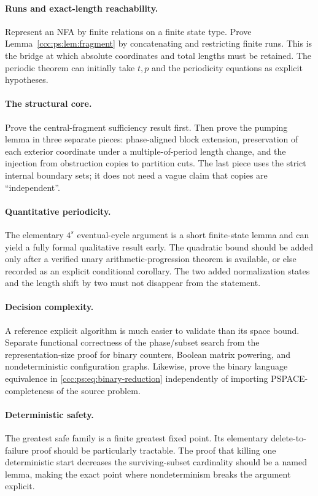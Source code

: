 \documentclass[11pt,letterpaper]{article}
\theoremstyle{definition}
\theoremstyle{remark}
\begin{document}
\paragraph{Runs and exact-length reachability.}
Represent an NFA by finite relations on a finite state type. Prove
Lemma~\ref{ccc:ps:lem:fragment} by concatenating and restricting finite runs.
This is the bridge at which absolute coordinates and total lengths must
be retained. The periodic theorem can initially take $t,p$ and the
periodicity equations as explicit hypotheses.

\paragraph{The structural core.}
Prove the central-fragment sufficiency result first. Then prove the
pumping lemma in three separate pieces: phase-aligned block extension,
preservation of each exterior coordinate under a multiple-of-period
length change, and the injection from obstruction copies to partition
cuts. The last piece uses the strict internal boundary sets; it does not
need a vague claim that copies are ``independent''.

\paragraph{Quantitative periodicity.}
The elementary $4^s$ eventual-cycle argument is a short finite-state
lemma and can yield a fully formal qualitative result early. The
quadratic bound should be added only after a verified unary
arithmetic-progression theorem is available, or else recorded as an
explicit conditional corollary. The two added normalization states and
the length shift by two must not disappear from the statement.

\paragraph{Decision complexity.}
A reference explicit algorithm is much easier to validate than its space
bound. Separate functional correctness of the phase/subset search from
the representation-size proof for binary counters, Boolean matrix
powering, and nondeterministic configuration graphs. Likewise, prove the
binary language equivalence in \eqref{ccc:ps:eq:binary-reduction} independently
of importing PSPACE-completeness of the source problem.

\paragraph{Deterministic safety.}
The greatest safe family is a finite greatest fixed point. Its elementary
delete-to-failure proof should be particularly tractable. The proof that
killing one deterministic start decreases the surviving-subset
cardinality should be a named lemma, making the exact point where
nondeterminism breaks the argument explicit.
\end{document}
